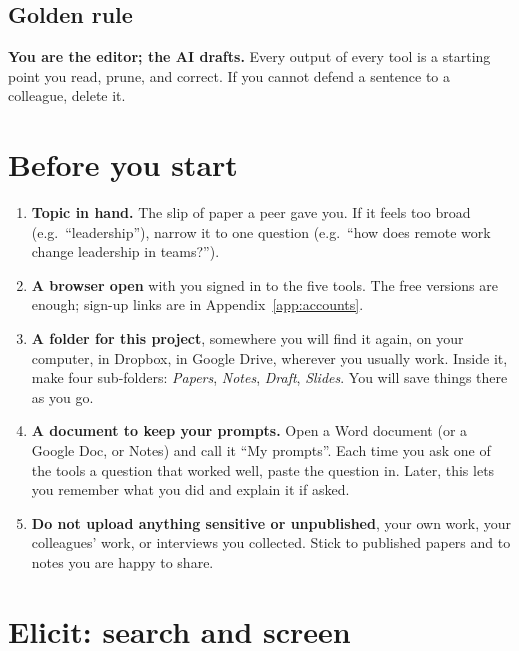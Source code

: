 \documentclass[11pt,a4paper]{article}
\begin{document}
\subsection{Golden rule}

\begin{tipbox}
\textbf{You are the editor; the AI drafts.} Every output of every tool is a starting point you read, prune, and correct. If you cannot defend a sentence to a colleague, delete it.
\end{tipbox}

\section{Before you start}
\label{sec:setup}

\begin{enumerate}[leftmargin=*, itemsep=2pt]
  \item \textbf{Topic in hand.} The slip of paper a peer gave you. If it feels too broad (e.g.\ ``leadership''), narrow it to one question (e.g.\ ``how does remote work change leadership in teams?'').
  \item \textbf{A browser open} with you signed in to the five tools. The free versions are enough; sign-up links are in Appendix~\ref{app:accounts}.
  \item \textbf{A folder for this project}, somewhere you will find it again, on your computer, in Dropbox, in Google Drive, wherever you usually work. Inside it, make four sub-folders: \emph{Papers}, \emph{Notes}, \emph{Draft}, \emph{Slides}. You will save things there as you go.
  \item \textbf{A document to keep your prompts.} Open a Word document (or a Google Doc, or Notes) and call it ``My prompts''. Each time you ask one of the tools a question that worked well, paste the question in. Later, this lets you remember what you did and explain it if asked.
  \item \textbf{Do not upload anything sensitive or unpublished}, your own work, your colleagues' work, or interviews you collected. Stick to published papers and to notes you are happy to share.
\end{enumerate}

\section{Elicit: search and screen}
\label{sec:elicit}
\end{document}
